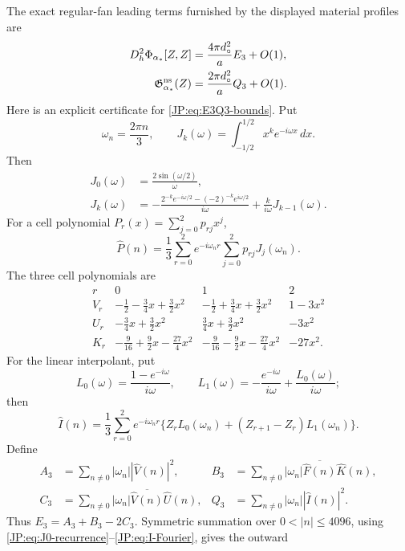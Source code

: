 \documentclass[11pt]{amsart}
\numberwithin{equation}{section}
\theoremstyle{definition}
\theoremstyle{remark}
\begin{document}
\iffalse
The exact regular-fan leading terms furnished by the displayed material
profiles are
\begin{align*}
 D_h^2\Phi_{\alpha_*}[Z,Z]
 &=\frac{4\pi d_\circ^2}{a}E_3+O(1),\\
 \mathfrak G_{\alpha_*}^{\rm ns}(Z)
 &=\frac{2\pi d_\circ^2}{a}Q_3+O(1).
\end{align*}
Here is an explicit certificate for \eqref{JP:eq:E3Q3-bounds}.  Put
\[
 \omega_n=\frac{2\pi n}{3},\qquad
 J_k(\omega)=\int_{-1/2}^{1/2}x^ke^{-i\omega x}\,dx.
\]
Then
\begin{align}
 J_0(\omega)&=\frac{2\sin(\omega/2)}{\omega},\label{JP:eq:J0-recurrence}\\
 J_k(\omega)&=
 -\frac{2^{-k}e^{-i\omega/2}-(-2)^{-k}e^{i\omega/2}}{i\omega}
 +\frac{k}{i\omega}J_{k-1}(\omega).\label{JP:eq:Jk-recurrence}
\end{align}
For a cell polynomial $P_r(x)=\sum_{j=0}^2p_{rj}x^j$,
\begin{equation}\label{JP:eq:poly-Fourier}
 \widehat P(n)=\frac13\sum_{r=0}^2e^{-i\omega_nr}
 \sum_{j=0}^2p_{rj}J_j(\omega_n).
\end{equation}
The three cell polynomials are
\[
\begin{array}{c|ccc}
r&0&1&2\\ \hline
V_r&-\frac12-\frac34x+\frac32x^2&
 -\frac12+\frac34x+\frac32x^2&1-3x^2\\
U_r&-\frac34x+\frac32x^2&
 \frac34x+\frac32x^2&-3x^2\\
K_r&-\frac9{16}+\frac92x-\frac{27}{4}x^2&
 -\frac9{16}-\frac92x-\frac{27}{4}x^2&-27x^2.
\end{array}
\]
For the linear interpolant, put
\[
 L_0(\omega)=\frac{1-e^{-i\omega}}{i\omega},\qquad
 L_1(\omega)=-\frac{e^{-i\omega}}{i\omega}
              +\frac{L_0(\omega)}{i\omega};
\]
then
\begin{equation}\label{JP:eq:I-Fourier}
 \widehat I(n)=\frac13\sum_{r=0}^2e^{-i\omega_nr}
 \{Z_rL_0(\omega_n)+(Z_{r+1}-Z_r)L_1(\omega_n)\}.
\end{equation}
Define
\[
\begin{aligned}
 A_3&=\sum_{n\ne0}|\omega_n||\widehat V(n)|^2,&
 B_3&=\sum_{n\ne0}|\omega_n|
       \overline{\widehat F(n)}\widehat K(n),\\
 C_3&=\sum_{n\ne0}|\omega_n|
       \overline{\widehat V(n)}\widehat U(n),&
 Q_3&=\sum_{n\ne0}|\omega_n||\widehat I(n)|^2.
\end{aligned}
\]
Thus $E_3=A_3+B_3-2C_3$.  Symmetric summation over
$0<|n|\le4096$, using
\eqref{JP:eq:J0-recurrence}--\eqref{JP:eq:I-Fourier}, gives the outward
\end{document}
